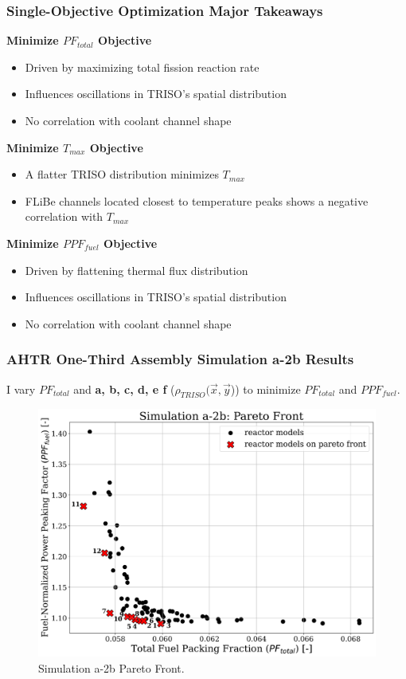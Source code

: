 \begin{frame}
    \frametitle{Single-Objective Optimization Major Takeaways}
    \textbf{Minimize $PF_{total}$ Objective} 
    \begin{itemize}
        \item Driven by maximizing total fission reaction rate
        \item Influences oscillations in TRISO's spatial distribution
        \item No correlation with coolant channel shape  
    \end{itemize}

    \vspace{0.2cm}
    \textbf{Minimize $T_{max}$ Objective}
    \begin{itemize}
        \item A flatter TRISO distribution minimizes $T_{max}$
        \item FLiBe channels located closest to temperature peaks shows a negative 
        correlation with $T_{max}$
    \end{itemize}

    \vspace{0.2cm}
    \textbf{Minimize $PPF_{fuel}$ Objective} 
    \begin{itemize}
        \item Driven by flattening thermal flux distribution
        \item Influences oscillations in TRISO's spatial distribution
        \item No correlation with coolant channel shape  
    \end{itemize}
\end{frame}

\begin{frame}
    \frametitle{AHTR One-Third Assembly Simulation a-2b Results}
    I vary $PF_{total}$ and \textbf{a, b, c, d, e f} ($\rho_{TRISO}(\vec{x}, \vec{y}$))
    to minimize $PF_{total}$ and $PPF_{fuel}$. 

    \vspace{0.1cm}
    \begin{figure}
        \includegraphics[width=0.73\linewidth]{../docs/figures/assem-obj-2-pfppf-pareto.png} 
        \caption{Simulation a-2b Pareto Front.}
    \end{figure}
\end{frame}


